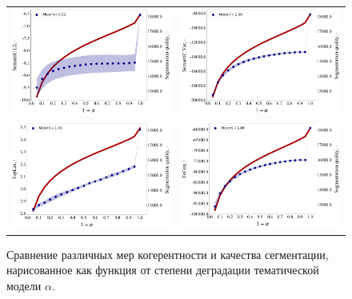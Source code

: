\begin{figure}
\begin{tabular}{cc}
    \includegraphics[width=70mm]{images/segm_l2.png} &   \includegraphics[width=70mm]{images/segm_var.png} \\
 \includegraphics[width=70mm]{images/segm_toplen.png} &   \includegraphics[width=70mm]{images/segm_focon.png} \\
\end{tabular}
    \caption{Сравнение различных мер когерентности и качества сегментации, нарисованное как функция от степени деградации тематической модели $\alpha$. }
\label{fig:ch3_corr}
\end{figure}




 

